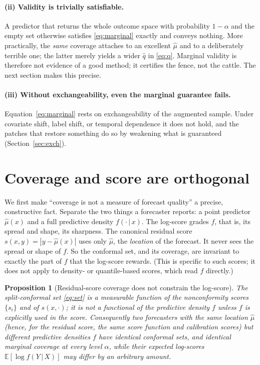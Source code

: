 \documentclass[11pt]{article}
\newtheorem{proposition}{Proposition}
\theoremstyle{definition}
\newcommand{\E}{\mathbb{E}}
\newcommand{\given}{\,\vert\,}
\begin{document}
\paragraph{(ii) Validity is trivially satisfiable.}
A predictor that returns the whole outcome space with probability $1-\alpha$ and the
empty set otherwise satisfies \eqref{eq:marginal} exactly and conveys nothing. More
practically, the \emph{same} coverage attaches to an excellent $\hat\mu$ and to a
deliberately terrible one; the latter merely yields a wider $\hat q$ in
\eqref{eq:q}. Marginal validity is therefore not evidence of a good method; it
certifies the fence, not the cattle. The next section makes this precise.

\paragraph{(iii) Without exchangeability, even the marginal guarantee fails.}
Equation~\eqref{eq:marginal} rests on exchangeability of the augmented sample. Under
covariate shift, label shift, or temporal dependence it does not hold, and the patches
that restore something do so by weakening what is guaranteed (Section~\ref{sec:exch}).

\section{Coverage and score are orthogonal}\label{sec:orthogonality}

We first make ``coverage is not a measure of forecast quality'' a precise, constructive
fact. Separate the two things a forecaster reports: a point predictor $\hat\mu(x)$ and a
full predictive density $f(\cdot\given x)$. The log-score grades $f$, that is, its spread
and shape, its sharpness. The canonical residual score $s(x,y)=|y-\hat\mu(x)|$ uses only
$\hat\mu$, the \emph{location} of the forecast. It never sees the spread or shape of $f$.
So the conformal set, and its coverage, are invariant to exactly the part of $f$ that the
log-score rewards. (This is specific to such scores; it does not apply to density- or
quantile-based scores, which read $f$ directly.)

\begin{proposition}[Residual-score coverage does not constrain the log-score]\label{prop:orth}
The split-conformal set \eqref{eq:set} is a measurable function of the nonconformity
scores $\{s_i\}$ and of $s(x,\cdot)$; it is not a functional of the predictive density
$f$ unless $f$ is explicitly used in the score. Consequently two forecasters with the
\emph{same} location $\hat\mu$ (hence, for the residual score, the same score function and
calibration scores) but different predictive densities $f$ have \emph{identical} conformal
sets, and identical marginal coverage at every level $\alpha$, while their expected
log-scores $\E[\log f(Y\given X)]$ may differ by an arbitrary amount.
\end{proposition}
\end{document}
